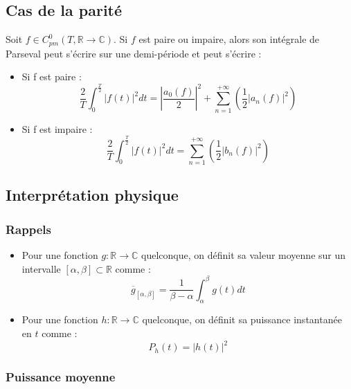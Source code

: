 \documentclass[12pt, a4paper]{article}
\newcommand*\mean[1]{\overline{#1}}
\begin{document}
\subsection{Cas de la parité}

Soit $f \in C_{pm}^0(T, \mathbb{R} \to \mathbb{C})$. Si $f$ est paire ou impaire, alors son intégrale de Parseval peut s'écrire sur une demi-période et peut s'écrire :

	\begin{itemize}
		\item Si f est paire :
			\begin{equation*}
				\frac{2}{T} \int_0^{\frac{T}{2}} |f(t)|^2 dt = \left|\frac{a_0(f)}{2}\right|^2 + \sum_{n=1}^{+\infty} \left( \frac{1}{2}|a_n(f)|^2 \right)
			\end{equation*}
		\item Si f est impaire :
			\begin{equation*}
				\frac{2}{T} \int_0^{\frac{T}{2}} |f(t)|^2 dt = \sum_{n=1}^{+\infty} \left( \frac{1}{2}|b_n(f)|^2 \right)
			\end{equation*}
	\end{itemize}

\subsection{Interprétation physique}

\subsubsection{Rappels}

\begin{itemize}
	\item Pour une fonction $g:\mathbb{R} \to \mathbb{C}$ quelconque, on définit sa valeur moyenne sur un intervalle $[\alpha, \beta] \subset \mathbb{R}$ comme :
		\begin{equation*}
			\mean{g}_{[\alpha, \beta]} = \frac{1}{\beta - \alpha} \int_\alpha^\beta g(t)dt
		\end{equation*}
	\item Pour une fonction $h:\mathbb{R} \to \mathbb{C}$ quelconque, on définit sa puissance instantanée en $t$ comme :
		\begin{equation*}
			P_h(t) = |h(t)|^2
		\end{equation*}
\end{itemize}

\subsubsection{Puissance moyenne}
\end{document}
